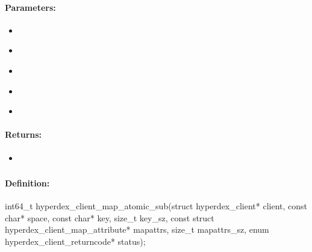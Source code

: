 \paragraph{Parameters:}
\begin{itemize}[noitemsep]
\item {}\\

\item {}\\

\item {}\\

\item {}\\

\item {}\\

\end{itemize}

\paragraph{Returns:}
\begin{itemize}[noitemsep]
\item {}\\

\end{itemize}

\pagebreak
\subsubsection{}
\label{api:c:map_atomic_sub}


\paragraph{Definition:}
\begin{ccode}
int64_t hyperdex_client_map_atomic_sub(struct hyperdex_client* client,
        const char* space,
        const char* key, size_t key_sz,
        const struct hyperdex_client_map_attribute* mapattrs, size_t mapattrs_sz,
        enum hyperdex_client_returncode* status);
\end{ccode}

